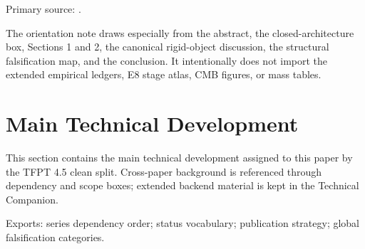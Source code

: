 \begin{tfptsourcebox}
Primary source: \sourceDraft.

The orientation note draws especially from the abstract, the closed-architecture box, Sections 1
and 2, the canonical rigid-object discussion, the structural falsification map, and the conclusion.
It intentionally does not import the extended empirical ledgers, E8 stage atlas, CMB figures, or
mass tables.
\end{tfptsourcebox}

\clearpage
\section{Main Technical Development}

This section contains the main technical development assigned to this paper by the TFPT 4.5 clean split. Cross-paper background is referenced through dependency and scope boxes; extended backend material is kept in the Technical Companion.




\begin{tfptexports}
Exports: series dependency order; status vocabulary; publication strategy; global falsification categories.
\end{tfptexports}



